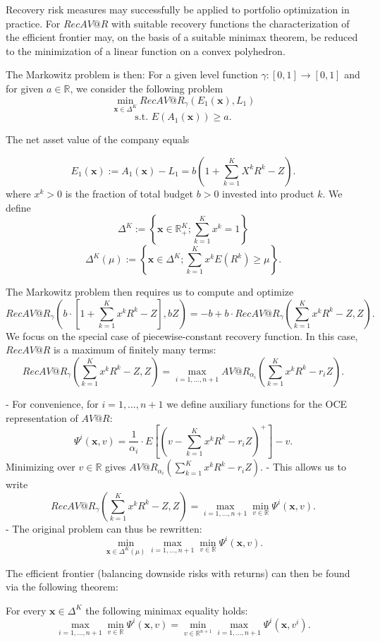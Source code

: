 Recovery risk measures may successfully be applied to portfolio optimization in practice.
For \(RecAV@R\) with suitable recovery functions the characterization of the efficient frontier may, on the basis of a suitable minimax theorem, 
be reduced to the minimization of a linear function on a convex polyhedron.

The Markowitz problem is then:
For a given level function \(\gamma: [0,1] \rightarrow [0,1]\) and for given \(a \in \mathbb{R}\), we consider the following problem
\[\min_{\mathbf{x} \in \Delta^K} RecAV@R_{\gamma}(E_1(\mathbf{x}), L_1)\]
\[\text{s.t. } E(A_1(\mathbf{x})) \geq a.\]


The net asset value of the company equals

\[E_1(\mathbf{x}) := A_1(\mathbf{x}) - L_1 = b \left( 1 + \sum_{k=1}^K X^k R^k - Z \right).\]
where \( x^k > 0\) is the fraction of total budget \( b > 0 \) invested into product \( k \).
We define
\[\Delta^K := \left\{ \mathbf{x} \in \mathbb{R}_+^K; \sum_{k=1}^K x^k = 1 \right\}\] 
\[\Delta^K(\mu) := \left\{ \mathbf{x} \in \Delta^K; \sum_{k=1}^K x^k E(R^k) \geq \mu \right\}.\]

The Markowitz problem then requires us to compute and optimize
\[RecAV@R_{\gamma} \left( b \cdot \left[ 1 + \sum_{k=1}^K x^k R^k - Z \right], bZ \right) = -b + b \cdot RecAV@R_{\gamma} \left( \sum_{k=1}^K x^k R^k - Z, Z \right).\]
We focus on the special case of piecewise-constant recovery function. In this case, \(RecAV@R\) is a maximum of finitely many terms:
\[RecAV@R_{\gamma} \left( \sum_{k=1}^K x^k R^k - Z, Z \right) = \max_{i=1, \dots, n+1} AV@R_{\alpha_i} \left( \sum_{k=1}^K x^k R^k - r_i Z \right).\]

- For convenience, for \(i = 1, \dots, n+1\) we define auxiliary functions for the OCE representation of \(AV@R\):
\[\Psi^i(\mathbf{x}, v) = \frac{1}{\alpha_i} \cdot E \left[ \left( v - \sum_{k=1}^K x^k R^k - r_i Z \right)^+ \right] - v.\]
Minimizing over \(v \in \mathbb{R}\) gives \(AV@R_{\alpha_i} \left( \sum_{k=1}^K x^k R^k - r_i Z \right)\).
- This allows us to write
\[RecAV@R_{\gamma} \left( \sum_{k=1}^K x^k R^k - Z, Z \right) = \max_{i=1, \dots, n+1} \min_{v \in \mathbb{R}} \Psi^i(\mathbf{x}, v).\]
- The original problem can thus be rewritten:
\[\min_{\mathbf{x} \in \Delta^K(\mu)} \max_{i=1, \dots, n+1} \min_{v \in \mathbb{R}} \Psi^i(\mathbf{x}, v).\]

The efficient frontier (balancing downside risks with returns) can then be found via the following theorem:

For every \(\mathbf{x} \in \Delta^K\) the following minimax equality holds:
\[\max_{i=1, \dots, n+1} \min_{v \in \mathbb{R}} \Psi^i(\mathbf{x}, v) = \min_{v \in \mathbb{R}^{n+1}} \max_{i=1, \dots, n+1} \Psi^i(\mathbf{x}, v^i).\]

